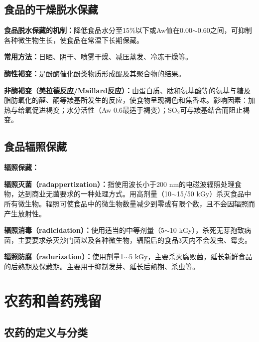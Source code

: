 \subsection{食品的干燥脱水保藏}

\begin{keybox}
\textbf{食品脱水保藏的机制：}降低食品水分至15\%以下或Aw值在0.00$\sim$0.60之间，可抑制各种微生物生长，使食品在常温下长期保藏。

\textbf{常用方法：}日晒、阴干、喷雾干燥、减压蒸发、冷冻干燥等。

\textbf{酶性褐变：}是酚酶催化酚类物质形成醌及其聚合物的结果。

\textbf{非酶褐变（美拉德反应/Maillard反应）：}由蛋白质、肽和氨基酸等的氨基与糖及脂肪氧化的醛、酮等羰基所发生的反应，使食物呈现褐色和焦香味。影响因素：加热与给氧促进褐变；水分活性（Aw 0.6最适于褐变）；SO$_2$可与羰基结合而阻止褐变。
\end{keybox}

\subsection{食品辐照保藏}

\begin{keybox}
\textbf{辐照保藏：}

\textbf{辐照灭菌（radappertization）：}指使用波长小于200 nm的电磁波辐照处理食物，达到商业无菌要求的一种处理方式。用高剂量（10$\sim$15/50 kGy）杀灭食品中所有微生物。辐照可使食品中的微生物数量减少到零或有限个数，且不会因辐照而产生放射性。

\textbf{辐照消毒（radicidation）：}使用适当的中等剂量（5$\sim$10 kGy），杀死无芽孢致病菌，主要要求杀灭沙门菌以及各种微生物，辐照后的食品3天内不会发虫、霉变。

\textbf{辐照防腐（radurization）：}使用剂量1$\sim$5 kGy，主要杀灭腐败菌，延长新鲜食品的后熟期及保藏期。主要用于抑制发芽、延长后熟期、杀虫等。
\end{keybox}

\section{农药和兽药残留}

\subsection{农药的定义与分类}

